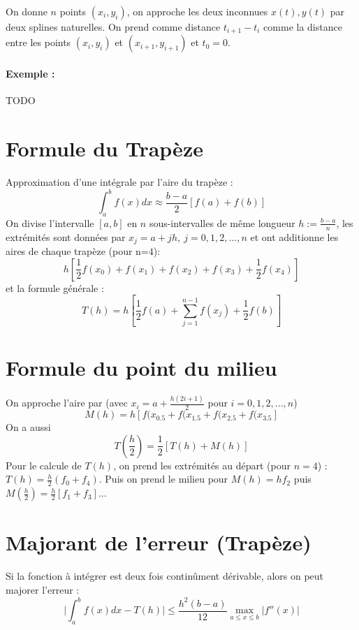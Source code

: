\documentclass[a4paper,9pt]{extarticle}
\begin{document}
On donne $n$ points $(x_i,y_i)$, on approche les deux inconnues $x(t),y(t)$ par deux splines naturelles. On prend comme distance $t_{i+1}-t_i$ comme la distance entre les points $(x_i,y_i)$ et $(x_{i+1},y_{i+1})$ et $t_0=0$.

\paragraph*{Exemple :}

TODO

\section{Formule du Trapèze}
Approximation d'une intégrale par l'aire du trapèze :
$$
\int_a^bf(x)dx\approx\frac{b-a}{2}[f(a)+f(b)]
$$
On divise l'intervalle $[a,b]$ en $n$ sous-intervalles de même longueur $h := \frac{b-a}{n}$, les extrémités sont données par $x_j=a+jh,\ j=0,1,2,...,n$ et ont additionne les aires de chaque trapèze (pour n=$4$):
$$
h[\frac{1}{2}f(x_0)+f(x_1)+f(x_2)+f(x_3)+\frac{1}{2}f(x_4)]
$$
et la formule générale :
$$
T(h)=h[\frac{1}{2}f(a)+\sum_{j=1}^{n-1}f(x_j)+\frac{1}{2}f(b)]
$$

\section{Formule du point du milieu}

On approche l'aire par (avec $x_i=a+\frac{h(2i+1)}{2}$ pour $i=0,1,2,...,n$)
$$
M(h)=h[f(x_{0.5}+f(x_{1.5}+f(x_{2.5}+f(x_{3.5}]
$$
On a aussi
$$
T(\frac{h}{2})=\frac{1}{2}[T(h)+M(h)]
$$
Pour le calcule de $T(h)$, on prend les extrémités au départ (pour $n=4$) : $T(h)=\frac{h}{2}(f_0+f_4)$. Puis on prend le milieu pour $M(h)=hf_2$ puis $M(\frac{h}{2})=\frac{h}{2}[f_1+f_3]$...

\section{Majorant de l'erreur (Trapèze)}
Si la fonction à intégrer est deux fois continûment dérivable, alors on peut majorer l'erreur :
$$
\Big|\int_a^bf(x)dx-T(h)\Big|\leq \frac{h^2(b-a)}{12} \max_{a\leq x \leq b}|f''(x)|
$$
\end{document}
